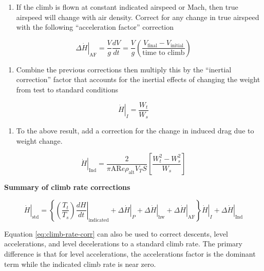 \documentclass[
]{book}
\providecommand{\tightlist}{%
  \setlength{\itemsep}{0pt}\setlength{\parskip}{0pt}}
\begin{document}
\begin{enumerate}
\def\labelenumi{\arabic{enumi}.}
\setcounter{enumi}{3}
\tightlist
\item
  If the climb is flown at constant indicated airspeed or Mach, then true
  airspeed will change with air density. Correct for any change in true airspeed
  with the following ``acceleration factor'' correction
\end{enumerate}

\[
\left. \Delta \dot{H} \right|_{\text{AF}} = \frac{V}{g} \frac{dV}{dt} = \frac{V}{g} \left( \frac{V_{\text{final}} - V_{\text{initial}}}{\text{time to climb}} \right)
\]

\begin{enumerate}
\def\labelenumi{\arabic{enumi}.}
\setcounter{enumi}{4}
\tightlist
\item
  Combine the previous corrections then multiply this by the ``inertial
  correction'' factor that accounts for the inertial effects of changing the
  weight from test to standard conditions
\end{enumerate}

\[
\left. \dot{H} \right|_I = \frac{W_t}{W_s}
\]

\begin{enumerate}
\def\labelenumi{\arabic{enumi}.}
\setcounter{enumi}{5}
\tightlist
\item
  To the above result, add a correction for the change in induced drag due to
  weight change.
\end{enumerate}

\[
\left. \dot{H} \right|_{\text{Ind}} = \frac{2}{\pi \mathrm{AR} e \rho_{\text{alt}} V_T S} \left[ \frac{W_t^2 - W_s^2}{W_s} \right]
\]

\textbf{Summary of climb rate corrections}

\[
\left. \dot{H} \right|_{\text{std}} = 
\left\{
      \left( \frac{T_t}{T_s}  \right)
      \left. \frac{dH}{dt} \right|_{\text{indicated}} +
      \left. \Delta \dot{H} \right|_P + 
      \left. \Delta \dot{H} \right|_{\text{hw}} +
      \left. \Delta \dot{H} \right|_{\text{AF}}   
\right\}
\left. \dot{H} \right|_I + 
\Delta \left. \dot{H} \right|_{\text{Ind}}
\label{eq:climb-rate-corr}
\]

Equation \eqref{eq:climb-rate-corr} can also be used to correct descents, level accelerations, and level decelerations to a standard climb rate. The primary difference is that for level accelerations, the accelerations factor is the dominant term while the indicated climb rate is near zero.
\end{document}
